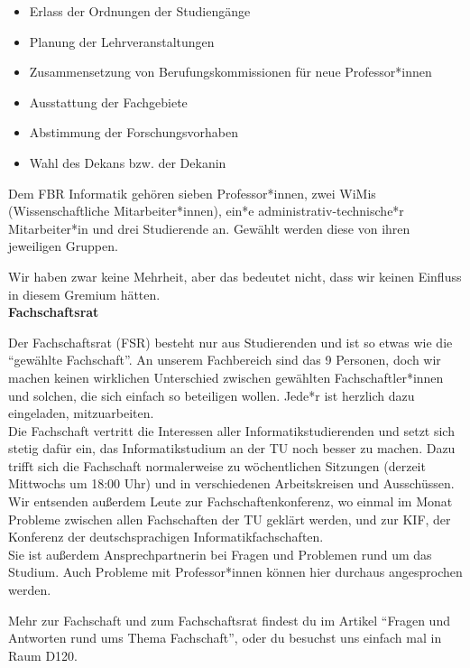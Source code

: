 {    \begin{itemize}
        \item Erlass der Ordnungen der Studiengänge
        \item Planung der Lehrveranstaltungen
        \item Zusammensetzung von Berufungskommissionen für neue Professor*innen
        \item Ausstattung der Fachgebiete
        \item Abstimmung der Forschungsvorhaben
        \item Wahl des Dekans bzw. der Dekanin
    \end{itemize}

    Dem FBR Informatik gehören sieben Professor*innen, zwei WiMis (Wissenschaftliche Mitarbeiter*innen), ein*e administrativ-technische*r Mitarbeiter*in und drei Studierende an. Gewählt werden diese von ihren jeweiligen Gruppen.

    Wir haben zwar keine Mehrheit, aber das bedeutet nicht, dass wir keinen Einfluss in diesem Gremium hätten. \\

    \noindent\textbf{Fachschaftsrat}

    Der Fachschaftsrat (FSR) besteht nur aus Studierenden und ist so etwas wie die "`gewählte Fachschaft"'. An unserem Fachbereich sind das 9 Personen, doch wir machen keinen wirklichen Unterschied zwischen gewählten Fachschaftler*innen und solchen, die sich einfach so beteiligen wollen. Jede*r ist herzlich dazu eingeladen, mitzuarbeiten.\\

    Die Fachschaft vertritt die Interessen aller Informatikstudierenden und setzt sich stetig dafür ein, das Informatikstudium an der TU noch besser zu machen. Dazu trifft sich die Fachschaft normalerweise zu wöchentlichen Sitzungen (derzeit Mittwochs um 18:00 Uhr) und in verschiedenen Arbeitskreisen und Ausschüssen. Wir entsenden außerdem Leute zur Fachschaftenkonferenz, wo einmal im Monat Probleme zwischen allen Fachschaften der TU geklärt werden, und zur KIF, der Konferenz der deutschsprachigen Informatikfachschaften.\\

    Sie ist außerdem Ansprechpartnerin bei Fragen und Problemen rund um das Studium. Auch Probleme mit Professor*innen können hier durchaus angesprochen werden.

    Mehr zur Fachschaft und zum Fachschaftsrat findest du im Artikel "`Fragen und Antworten rund ums Thema Fachschaft"', oder du besuchst uns einfach mal in Raum D120.

}
